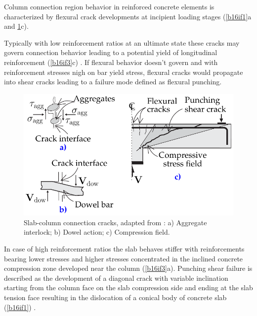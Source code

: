 Column connection region behavior in reinforced concrete elements is characterized by flexural crack developments at incipient loading stages (\ref{b16if1}a and \ref{b16if2}c). 

Typically with low reinforcement ratios at an ultimate state these cracks may govern connection behavior leading to a potential yield of longitudinal reinforcement (\ref{b16if3}c) \citep{hallgren1996punching}.  If flexural behavior doesn't govern and with reinforcement stresses nigh on bar yield stress, flexural cracks would propagate into shear cracks leading to a failure mode defined as flexural punching\citep{fib2001}.

    \begin{figure}\centering
        \includegraphics[width=\columnwidth]{Figures/tikzout/b16if2.pdf}\caption{Slab-column connection cracks, adapted from \cite{bompa2016b}: a) Aggregate interlock; b) Dowel action; c) Compression field.}\label{b16if2}
        \end{figure}

In case of high reinforcement ratios the slab behaves stiffer with reinforcements bearing lower stresses and higher stresses concentrated in the inclined concrete compression zone developed near the column (\ref{b16if3}a)\citep{hallgren1996punching}. Punching shear failure is described as the development of a diagonal crack with variable inclination starting from the column face on the slab compression side and ending at the slab tension face resulting in the dislocation of a conical body of concrete slab (\ref{b16if1}) \citep{regan1986}.


